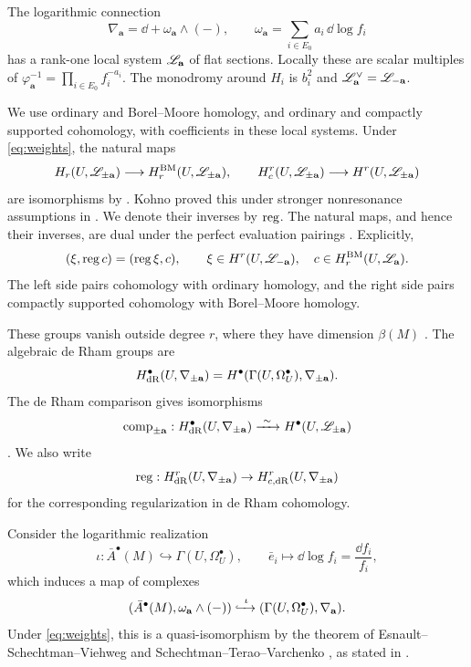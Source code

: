 The logarithmic connection
\[
 \nabla_{\mathbf a}=\dd+\omega_{\mathbf a}\wedge(-),\qquad
 \omega_{\mathbf a}=\sum_{i\in E_0}a_i\,\dd\log f_i
\]
has a rank-one local system $\mathscr L_{\mathbf a}$ of flat sections.
Locally these are scalar multiples of
$\varphi_{\mathbf a}^{-1}=\prod_{i\in E_0}f_i^{-a_i}$.
The monodromy around $H_i$ is $b_i^2$ and
$\mathscr L_{\mathbf a}^{\vee}=\mathscr L_{-\mathbf a}$.

We use ordinary and Borel--Moore homology, and ordinary and compactly
supported cohomology, with coefficients in these local systems.
Under \eqref{eq:weights}, the natural maps
\[
 H_r(U,\mathscr L_{\pm\mathbf a})\longrightarrow
 H_r^{\mathrm{BM}}(U,\mathscr L_{\pm\mathbf a}),\qquad
 H_c^r(U,\mathscr L_{\pm\mathbf a})\longrightarrow
 H^r(U,\mathscr L_{\pm\mathbf a})
\]
are isomorphisms by \cite[Theorem 12.3]{Lam}. Kohno proved this under
stronger nonresonance assumptions in \cite[Theorem 1]{Kohno}.
We denote their inverses by $\operatorname{reg}$.
The natural maps, and hence their inverses, are dual under the perfect
evaluation pairings \cite[equation (12.3)]{Lam}. Explicitly,
\[
 (\xi,\operatorname{reg} c)=(\operatorname{reg}\xi,c),
 \qquad \xi\in H^r(U,\mathscr L_{-\mathbf a}),\quad
 c\in H_r^{\mathrm{BM}}(U,\mathscr L_{\mathbf a}).
\]
The left side pairs cohomology with ordinary homology, and the right
side pairs compactly supported cohomology with Borel--Moore homology.

These groups vanish outside degree $r$, where they have dimension
$\beta(M)$ \cite[Theorem 12.3 and Section 12.3]{Lam}.
The algebraic de Rham groups are
\[
 H^\bullet_{\mathrm{dR}}(U,\nabla_{\pm\mathbf a})
 =H^\bullet(\Gamma(U,\Omega_U^\bullet),\nabla_{\pm\mathbf a}).
\]
The de Rham comparison gives isomorphisms
\[
 \operatorname{comp}_{\pm\mathbf a}:H^\bullet_{\mathrm{dR}}(U,\nabla_{\pm\mathbf a})
 \xrightarrow{\ \sim\ }H^\bullet(U,\mathscr L_{\pm\mathbf a})
\]
\cite[Section 12.3]{Lam}. We also write 
\[\operatorname{reg}: H^r_{\mathrm{dR}}(U,\nabla_{\pm\mathbf a}) \to H^r_{c,\mathrm{dR}}(U,\nabla_{\pm\mathbf a}) \] for the corresponding
regularization in de Rham cohomology.

Consider the logarithmic realization
\[
 \iota:\bar A^{\bullet}(M)\hookrightarrow\Gamma(U,\Omega_U^{\bullet}),
 \qquad \bar e_i\longmapsto\dd\log f_i=\frac{\dd f_i}{f_i},
\]
which induces a map of complexes
\[
 (\bar A^{\bullet}(M),\omega_{\mathbf a}\wedge(-))
 \xhookrightarrow{\ \iota\ }
 (\Gamma(U,\Omega_U^{\bullet}),\nabla_{\mathbf a}).
\]
Under \eqref{eq:weights}, this is a quasi-isomorphism by the theorem
of Esnault--Schechtman--Viehweg \cite{EsnaultSchechtmanViehweg1992}
and Schechtman--Terao--Varchenko \cite{SchechtmanTeraoVarchenko1995},
as stated in \cite[Theorem 12.4]{Lam}.

